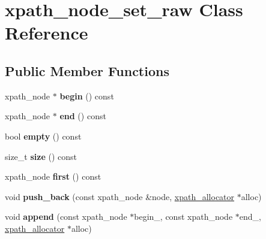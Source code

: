 \hypertarget{classxpath__node__set__raw}{\section{xpath\-\_\-node\-\_\-set\-\_\-raw Class Reference}
\label{classxpath__node__set__raw}
}
\subsection*{Public Member Functions}
\begin{DoxyCompactItemize}
\item 
\hypertarget{classxpath__node__set__raw_a8d08142ac662315aa23395a44f301b66}{xpath\-\_\-node $\ast$ {\bfseries begin} () const }\label{classxpath__node__set__raw_a8d08142ac662315aa23395a44f301b66}

\item 
\hypertarget{classxpath__node__set__raw_a6be07e8a83744082cf106d4611da0164}{xpath\-\_\-node $\ast$ {\bfseries end} () const }\label{classxpath__node__set__raw_a6be07e8a83744082cf106d4611da0164}

\item 
\hypertarget{classxpath__node__set__raw_affb19c256fef52cc4d34e59a9ac0c2b6}{bool {\bfseries empty} () const }\label{classxpath__node__set__raw_affb19c256fef52cc4d34e59a9ac0c2b6}

\item 
\hypertarget{classxpath__node__set__raw_a7121a0eb1af207606b9613747834f3bd}{size\-\_\-t {\bfseries size} () const }\label{classxpath__node__set__raw_a7121a0eb1af207606b9613747834f3bd}

\item 
\hypertarget{classxpath__node__set__raw_ac6d6a4e637df45137d7cb6c925230830}{xpath\-\_\-node {\bfseries first} () const }\label{classxpath__node__set__raw_ac6d6a4e637df45137d7cb6c925230830}

\item 
\hypertarget{classxpath__node__set__raw_a676ec123e5be874869c78ff5c43ae9c2}{void {\bfseries push\-\_\-back} (const xpath\-\_\-node \&node, \hyperlink{classxpath__allocator}{xpath\-\_\-allocator} $\ast$alloc)}\label{classxpath__node__set__raw_a676ec123e5be874869c78ff5c43ae9c2}

\item 
\hypertarget{classxpath__node__set__raw_a0c02728de3d895a2d12df9666d60e414}{void {\bfseries append} (const xpath\-\_\-node $\ast$begin\-\_\-, const xpath\-\_\-node $\ast$end\-\_\-, \hyperlink{classxpath__allocator}{xpath\-\_\-allocator} $\ast$alloc)}\label{classxpath__node__set__raw_a0c02728de3d895a2d12df9666d60e414}


\end{DoxyCompactItemize}

